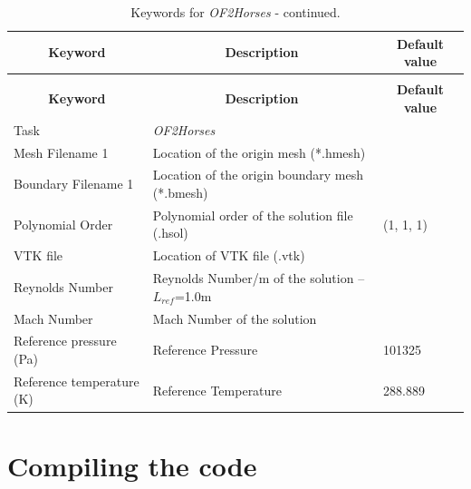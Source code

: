 \documentclass[a4paper,10pt]{report}
\begin{document}
\begin{longtable}{|p{5cm}|p{9cm}|p{2.2cm}|}
\caption{Keywords for \textit{OF2Horses}.} \label{tab:OF2Horses} \\
\hline
\multicolumn{1}{|c|}{\textbf{Keyword}} & \multicolumn{1}{c|}{\textbf{Description}} & \multicolumn{1}{c|}{\textbf{Default value}} \\ \hline
\endfirsthead

\caption{Keywords for \textit{OF2Horses} - continued.} \\
\hline
\multicolumn{1}{|c|}{\textbf{Keyword}} & \multicolumn{1}{c|}{\textbf{Description}} & \multicolumn{1}{c|}{\textbf{Default value}} \\ \hline
\endhead

Task 	        		& \textit{OF2Horses} 						&  \\ \hline
Mesh Filename 1 		& Location of the origin mesh (*.hmesh) 	&  \\ \hline
Boundary Filename 1 	& Location of the origin boundary mesh (*.bmesh) 	&  \\ \hline
Polynomial Order 	& Polynomial order of the solution file (.hsol)  & (1, 1, 1) \\ \hline
VTK file         	& Location of VTK file (.vtk)   &             \\ \hline
Reynolds Number    	& Reynolds Number/m of the solution -- $L_{ref}$=1.0m   &             \\ \hline
Mach Number         	& Mach Number of the solution      &             \\ \hline
Reference pressure (Pa)         	& Reference Pressure   & 101325             \\ \hline
Reference temperature (K)        & Reference Temperature   & 288.889             \\ \hline

\end{longtable}


\chapter{Compiling the code}
\end{document}
